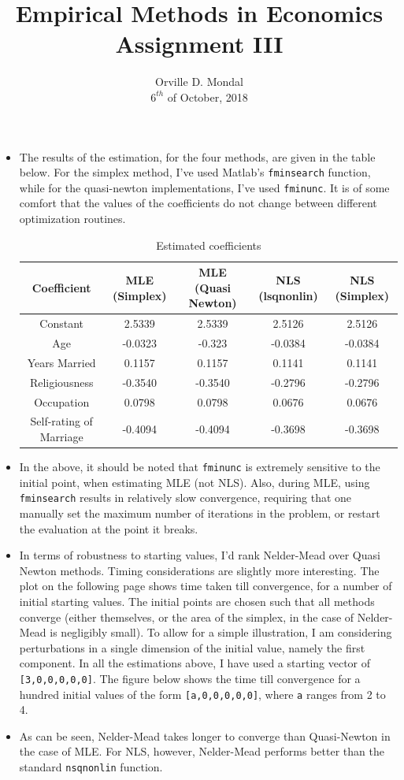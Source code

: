 \documentclass[12pt,a4paper]{article}
\title{Empirical Methods in Economics\\\small{Assignment III}}
\date{Orville D. Mondal\\ $6^{th}$ of October, 2018\vspace{-3ex}}
\begin{document}
\maketitle
\begin{itemize}
\item The results of the estimation, for the four methods, are given in the table below. For the simplex method, I've used Matlab's \texttt{fminsearch} function, while for the quasi-newton implementations, I've used \texttt{fminunc}. It is of some comfort that the values of the coefficients do not change between different optimization routines.
\begin{table}[h]
\caption{Estimated coefficients}\vspace{2mm}
\centering
\begin{tabular}{c c c c c}
\hline \hline\vspace{2mm}
Coefficient &MLE (Simplex) &MLE (Quasi Newton) &NLS (lsqnonlin) &NLS (Simplex)\\
\hline
Constant&2.5339&2.5339&2.5126&2.5126\\
Age&-0.0323&-0.323&-0.0384&-0.0384\\
Years Married&0.1157&0.1157&0.1141&0.1141\\
Religiousness&-0.3540&-0.3540&-0.2796&-0.2796\\
Occupation&0.0798&0.0798&0.0676&0.0676\\
Self-rating of Marriage&-0.4094&-0.4094&-0.3698&-0.3698\\
\end{tabular}
\end{table}
\item In the above, it should be noted that \texttt{fminunc} is extremely sensitive to the initial point, when estimating MLE (not NLS). Also, during MLE, using \texttt{fminsearch} results in relatively slow convergence, requiring that one manually set the maximum number of iterations in the problem, or restart the evaluation at the point it breaks.
\item In terms of robustness to starting values, I'd rank Nelder-Mead over Quasi Newton methods. Timing considerations are slightly more interesting. The plot on the following page shows time taken till convergence, for a number of initial starting values. The initial points are chosen such that all methods converge (either themselves, or the area of the simplex, in the case of Nelder-Mead is negligibly small). To allow for a simple illustration, I am considering perturbations in a single dimension of the initial value, namely the first component. In all the estimations above, I have used a starting vector of \texttt{[3,0,0,0,0,0]}. The figure below shows the time till convergence for a hundred initial values of the form \texttt{[a,0,0,0,0,0]}, where \texttt{a} ranges from 2 to 4.
\item As can be seen, Nelder-Mead takes longer to converge than Quasi-Newton in the case of MLE. For NLS, however, Nelder-Mead performs better than the standard \texttt{nsqnonlin} function.
\end{itemize}
\end{document}
